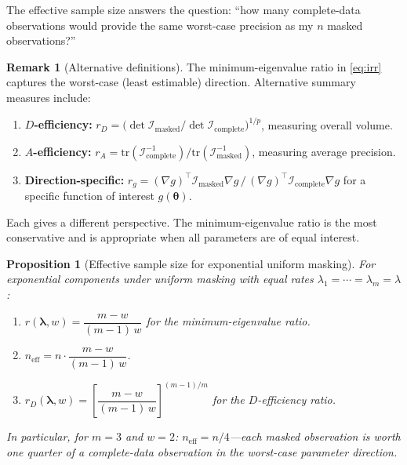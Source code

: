 \documentclass[11pt]{article}
\theoremstyle{definition}
\newtheorem{remark}{Remark}
\theoremstyle{plain}
\newtheorem{proposition}{Proposition}
\renewcommand{\v}[1]{\boldsymbol{#1}}
\newcommand{\btheta}{\v{\theta}}
\newcommand{\tr}{\mathrm{tr}}
\newcommand{\FI}{\mathcal{I}}       %
\begin{document}
The effective sample size answers the question: ``how many
complete-data observations would provide the same worst-case
precision as my $n$ masked observations?''

\begin{remark}[Alternative definitions]
\label{rem:ess-alternatives}
The minimum-eigenvalue ratio in \eqref{eq:irr} captures the worst-case
(least estimable) direction.
Alternative summary measures include:
\begin{enumerate}[nosep]
    \item \textbf{$D$-efficiency:}
    $r_D = \bigl(\det \FI_{\mathrm{masked}} / \det \FI_{\mathrm{complete}}\bigr)^{1/p}$,
    measuring overall volume.
    \item \textbf{$A$-efficiency:}
    $r_A = \tr(\FI_{\mathrm{complete}}^{-1}) / \tr(\FI_{\mathrm{masked}}^{-1})$,
    measuring average precision.
    \item \textbf{Direction-specific:}
    $r_g = (\nabla g)^\top \FI_{\mathrm{masked}} \nabla g \,/\,
    (\nabla g)^\top \FI_{\mathrm{complete}} \nabla g$
    for a specific function of interest $g(\btheta)$.
\end{enumerate}
Each gives a different perspective.
The minimum-eigenvalue ratio is the most conservative and is
appropriate when all parameters are of equal interest.
\end{remark}

\begin{proposition}[Effective sample size for exponential uniform masking]
\label{prop:ess-expo}
For exponential components under uniform masking with equal rates
$\lambda_1 = \cdots = \lambda_m = \lambda$:
\begin{enumerate}[label=(\alph*)]
    \item $r(\v{\lambda}, w) = \dfrac{m - w}{(m-1)\,w}$ for the minimum-eigenvalue ratio.
    \item $n_{\mathrm{eff}} = n \cdot \dfrac{m - w}{(m-1)\,w}$.
    \item $r_D(\v{\lambda}, w) = \left[\dfrac{m-w}{(m-1)\,w}\right]^{(m-1)/m}$
    for the $D$-efficiency ratio.
\end{enumerate}
In particular, for $m = 3$ and $w = 2$:
$n_{\mathrm{eff}} = n/4$---each masked observation is worth one quarter of a
complete-data observation in the worst-case parameter direction.
\end{proposition}
\end{document}
